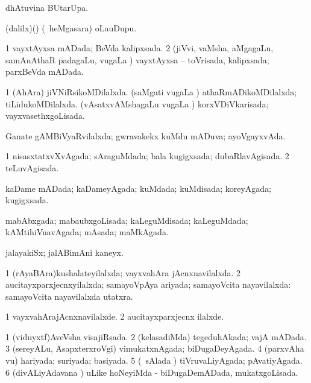 \bentry
{} 
\gl{\kirx}
\bmng
  dhAtuvina BUtarUpa. 
\emng
\eentry

\bentry
{} 
\gl{\nA}
\expl{}
\bmng
 (\bava dalilx)(\AmA) (\kanmu\ heMgasara) oLauDupu. 
\emng
\eentry

\bentry
{} 
\gl{\gu}
\expl{}
\bmng
\bnum
\num{1} vayxtAyxsa mADada; BeVda kalipxsada. 
\num{2} (jiVvi, vaMsha, aMgagaLu, samAnAthaR padagaLu, \mo vugaLa \vi) vayxtAyxsa -- toVrisada, kalipxsada; parxBeVda mADada. 
\enum
\emng
\eentry

\bentry
{} 
\gl{\gu}
\expl{}
\bmng
\bnum
\num{1} (AhAra) jiVNiRsikoMDilalxda. 
\banum
{} (saMgati \mo vugaLa \vi) athaRmADikoMDilalxda; tiLidukoMDilalxda. 
 (vAsatxvAMshagaLu \mo vugaLa \vi) korxVDiVkarisada; vayxvasethxgoLisada. 
\eanum
\numie
\enum
\emng
\eentry

\bentry
{} 
\gl{\gu}
\expl{}
\bmng
 Ganate gAMBiVyaRvilalxda; gwravakekx kuMdu mADuva; ayoVgayxvAda. 
\emng
\eentry

\bentry
{} 
\gl{\gu} 
\bmng
\bnum
\num{1} nisasxtatxvXvAgada; sAraguMdada; bala kugigxsada; dubaRlavAgisada. 
\num{2} teLuvAgisada. 
\enum
\emng
\eentry

\bentry
{} 
\gl{\gu}
\expl{}
\bmng
 kaDame mADada; kaDameyAgada; kuMdada; kuMdisada; koreyAgada; kugigxsada. 
\emng
\eentry

\bentry
{} 
\gl{\gu}
\expl{}
\bmng
 mabAbxgada; mabaubxgoLisada; kaLeguMdisada; kaLeguMdada; kAMtihiVnavAgada; mAsada; maMkAgada. 
\emng
\eentry

\bentry
{} 
\gl{\nA}
\expl{}
\bmng
 jalayakiSx; jalABimAni kaneyx. 
\emng
\eentry

\bentry
{} 
\gl{\gu}
\expl{}
\bmng
\bnum
\num{1} (rAyaBAra)kushalateyilalxda; vayxvahAra jAcnxnavilalxda. 
\num{2} aucitayxparxjecnxyilalxda; samayoVpAya ariyada; samayoVcita nayavilalxda:  samayoVcita nayavilalxda utatxra. 
\enum
\emng
\eentry

\bentry
{} 
\gl{\kirxvi}
\expl{}
\bmng
\bnum
\num{1} vayxvahArajAcnxnavilalxde. 
\num{2} aucitayxparxjecnx ilalxde. 
\enum
\emng
\eentry

\bentry
{} 
\gl{\gu}
\expl{}
\bmng
\bnum
\num{1} (viduyxtf)AveVsha visajiRsada. 
\num{2} (kelasadiMda) tegeduhAkada; vajA mADada. 
\num{3} (sereyALu, AsapxterxroVgi) vimukatxnAgada; biDugaDeyAgada. 
\num{4} (parxvAha \mo vu) hariyada; suriyada; basiyada. 
\num{5} (\kanmu\ sAlada \vi) tiVruvaLiyAgada; pAvatiyAgada. 
\num{6} (divALiyAdavana \vi) uLike hoNeyiMda - biDugaDemADada, mukatxgoLisada. 
\enum
\emng
\eentry

